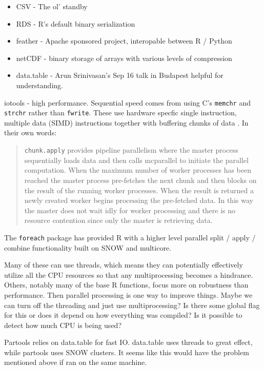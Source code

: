 \documentclass[12pt]{article}
\begin{document}
\begin{itemize}
    \item CSV - The ol' standby
    \item RDS - R's default binary serialization
    \item feather - Apache sponsored project, interopable between R /
        Python
    \item netCDF - binary storage of arrays with various levels of
        compression
    \item data.table - Arun Srinivasan's Sep 16 talk in Budapest helpful
        for understanding.

\end{itemize}


iotools - high performance. Sequential speed comes from
using C's \texttt{memchr} and \texttt{strchr} rather than \texttt{fwrite}.
These use hardware specfic single instruction, multiple data (SIMD)
instructions together with buffering chunks of data
\cite{arnold2015iotools}. In their own words:

\begin{quote}
    \texttt{chunk.apply} provides pipeline parallelism
    where the master process sequentially loads data and then calls
    mcparallel to initiate the parallel computation. When the maximum
    number of worker processes has been reached the master process
    pre-fetches the next chunk and then blocks on the result of the running
    worker processes. When the result is returned a newly created worker
    begins processing the pre-fetched data. In this way the master does not
    wait idly for worker processing and there is no resource contention
    since only the master is retrieving data. \cite{arnold2015iotools}
\end{quote}

The \texttt{foreach} package has provided R with a higher level parallel
split / apply / combine functionality built on SNOW and multicore.

Many of these can use threads, which means they can potentially effectively
utilize all the CPU resources so that any multiprocessing becomes a hindrance.
Others, notably many of the base R functions, focus more on robustness than
performance. Then parallel processing is one way to improve things.
Maybe we can turn off the threading and just use multiprocessing? Is there
some global flag for this or does it depend on how everything was compiled?
Is it possible to detect how much CPU is being used?

Partools relies on data.table for fast IO. data.table uses
threads to great effect, while partools uses SNOW clusters. It seems like
this would have the problem mentioned above if ran on the same machine.
\end{document}
